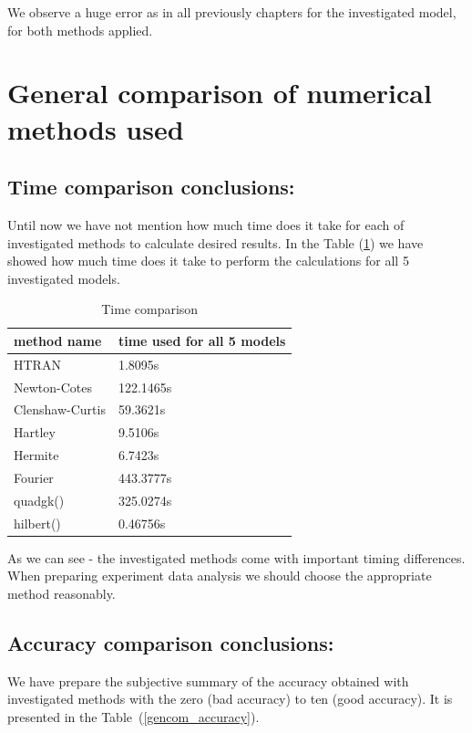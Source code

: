 \documentclass[12pt,twoside,a4paper]{article}
\numberwithin{equation}{subsection}
\numberwithin{figure}{subsection}
\begin{document}
We observe a huge error as in all previously chapters for the investigated model, for both methods applied.

\section{General comparison of numerical methods used} \label{chap:comparison}

\subsection{Time comparison conclusions:} \label{chap:gencom_time}

Until now we have not mention how much time does it take for each of investigated methods to calculate desired results. In the Table (\ref{gencom_time}) we have showed how much time does it take to perform the calculations for all 5 investigated models.

\begin{table}
  \caption{Time comparison} \label{gencom_time} 
  \begin{tabular}{l l}
    method name  &  time used for all 5 models \\
    \hline
    HTRAN & 1.8095s \\
    Newton-Cotes &  122.1465s \\
    Clenshaw-Curtis & 59.3621s \\
    Hartley & 9.5106s \\
    Hermite & 6.7423s \\
    Fourier & 443.3777s \\
    quadgk() & 325.0274s \\
    hilbert() & 0.46756s \\
    \hline
  \end{tabular}
\end{table} 

As we can see - the investigated methods come with important timing differences. When preparing experiment data analysis we should choose the appropriate method reasonably.

\subsection{Accuracy comparison conclusions:} \label{chap:gencom_accuracy}

We have prepare the subjective summary of the accuracy obtained with investigated methods with the zero (bad accuracy) to ten (good accuracy). It is presented in the Table~(\ref{gencom_accuracy}).
\end{document}
